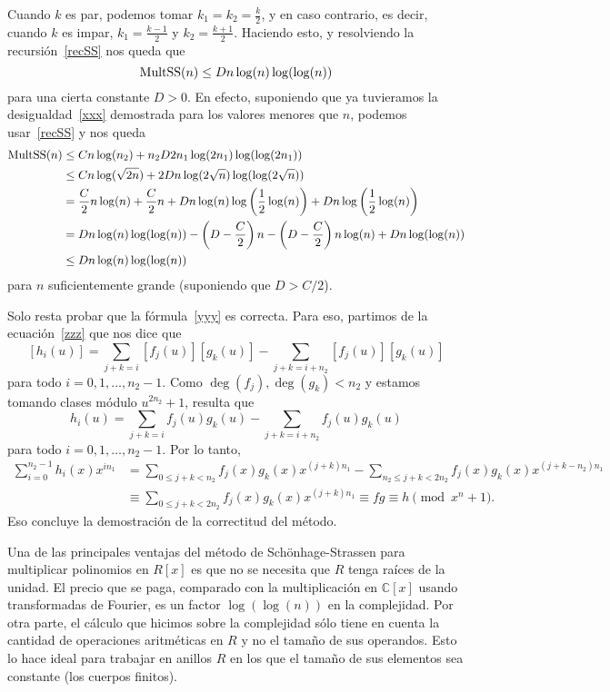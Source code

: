 \documentclass[a4paper, 11pt]{article}
\newcommand{\CC}{\mathbb{C}}
\theoremstyle{plain}
\theoremstyle{definition}
\begin{document}
Cuando $k$ es par, podemos tomar $k_1=k_2=\frac{k}2$, y en caso contrario,
es decir, cuando $k$ es impar, $k_1=\frac{k-1}{2}$ y $k_2=\frac{k+1}{2}$.
Haciendo esto, y resolviendo la recursión~\eqref{recSS} nos queda que
\begin{equation}\label{xxx}
{\rm MultSS}(n)\leq Dn\log(n)\log(\log(n))
\end{equation}
para una cierta constante $D>0$. En efecto, suponiendo que ya tuvieramos
la desigualdad~\eqref{xxx} demostrada para los valores menores que $n$,
podemos usar~\eqref{recSS} y nos queda
\[
\begin{aligned}
 {\rm MultSS}(n) &\leq Cn\log(n_2)+n_2D2n_1\log(2n_1)\log(\log(2n_1))\\
 &\leq Cn\log(\sqrt{2n})+2Dn\log(2\sqrt{n})\log(\log(2\sqrt{n})) \\
 &= \frac{C}{2}n\log(n)+\frac{C}2n +Dn\log(n)\log\left(\frac12\log(n)\right) + Dn\log\left(\frac12\log(n)\right)\\
 &= Dn\log(n)\log(\log(n)) - \left(D-\frac{C}2\right)n - \left(D-\frac{C}{2}\right)n\log(n) + Dn\log(\log(n))\\
 &\leq Dn\log(n)\log(\log(n))
\end{aligned}
\]
para $n$ suficientemente grande (suponiendo que $D>C/2$).

\bigskip

Solo resta probar que la fórmula~\eqref{yyy} es correcta. Para eso, partimos
de la ecuación~\eqref{zzz} que nos dice que
\[
   [h_i(u)] = \sum_{j+k=i}[f_j(u)][g_k(u)] - \sum_{j+k=i+n_2}[f_j(u)][g_k(u)]
\]
para todo $i=0,1,\ldots,n_2-1$.
Como $\deg(f_j),\deg(g_k)<n_2$ y estamos tomando clases módulo $u^{2n_2}+1$,
resulta que
\[
   h_i(u) = \sum_{j+k=i}f_j(u)g_k(u) - \sum_{j+k=i+n_2}f_j(u)g_k(u)
\]
para todo $i=0,1,\ldots,n_2-1$. Por lo tanto,
\[
\begin{aligned}
  \sum_{i=0}^{n_2-1}h_i(x)x^{in_1}
  &=  \sum_{0\leq j+k<n_2}f_j(x)g_k(x)x^{(j+k)n_1}
    -\sum_{n_2\leq j+k<2n_2}f_j(x)g_k(x)x^{(j+k-n_2)n_1}\\
  &\equiv \sum_{0\leq j+k<2n_2} f_j(x)g_k(x)x^{(j+k)n_1}
  \equiv fg\equiv h\pmod{x^n+1}.
\end{aligned}
\]
Eso concluye la demostración de la correctitud del método.

\bigskip

Una de las principales ventajas del método de Schönhage-Strassen para
multiplicar polinomios en $R[x]$ es que no se necesita que $R$ tenga
raíces de la unidad. El precio que se paga, comparado con la multiplicación
en $\CC[x]$ usando transformadas de Fourier, es un factor $\log(\log(n))$ en
la complejidad. Por otra parte, el cálculo que hicimos sobre la complejidad
sólo tiene en cuenta la cantidad de operaciones aritméticas en $R$ y no el
tamaño de sus operandos. Esto lo hace ideal para trabajar en anillos $R$
en los que el tamaño de sus elementos sea constante (los cuerpos finitos).
\end{document}
